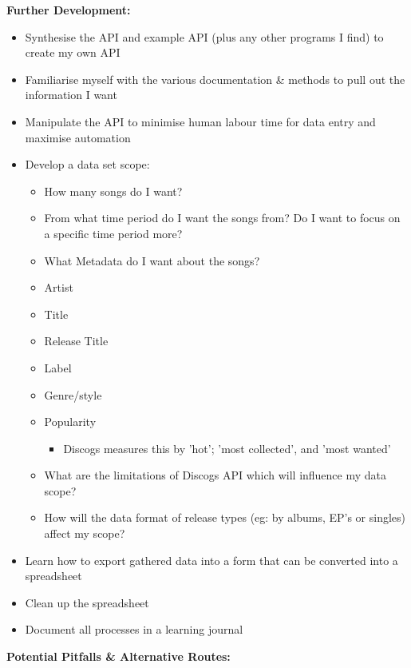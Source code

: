 \documentclass{article}
\begin{document}
\textbf{Further Development:}
\begin{itemize}
    \item Synthesise the API and example API (plus any other programs I find) to create my own API
    \item Familiarise myself with the various documentation \& methods to pull out the information I want
    \item Manipulate the API to minimise human labour time for data entry and maximise automation
    \item Develop a data set scope:
    \begin{itemize}
        \item How many songs do I want?
        \item From what time period do I want the songs from? Do I want to focus on a specific time period more?
        \item What Metadata do I want about the songs?
            \item Artist
            \item Title
            \item Release Title
            \item Label
            \item Genre/style
            \item Popularity
            \begin{itemize}
                \item Discogs measures this by 'hot'; 'most collected', and 'most wanted'
            \end{itemize}
        \item What are the limitations of Discogs API which will influence my data scope?
        \item How will the data format of release types (eg: by albums, EP's or singles) affect my scope?
    \end{itemize}
    \item Learn how to export gathered data into a form that can be converted into a spreadsheet
    \item Clean up the spreadsheet
    \item Document all processes in a learning journal
\end{itemize}
\textbf{Potential Pitfalls \& Alternative Routes:}
\end{document}
